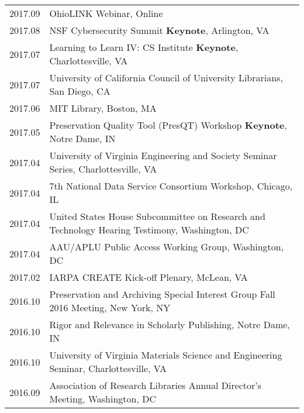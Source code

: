 \documentclass[11pt]{article}
\begin{document}
\begin{tabularx}{\textwidth}{lX}
    2017.09     & OhioLINK Webinar, Online \\ %
    2017.08     & NSF Cybersecurity Summit \textbf{Keynote}, Arlington, VA \\ %
    2017.07     & Learning to Learn IV: CS Institute \textbf{Keynote}, Charlottesville, VA \\ %
    2017.07     & University of California Council of University Librarians, San Diego, CA \\
    2017.06     & MIT Library, Boston, MA \\
    2017.05     & Preservation Quality Tool (PresQT) Workshop \textbf{Keynote}, Notre Dame, IN\\%
    2017.04     & University of Virginia Engineering and Society Seminar Series, Charlottesville, VA\\
    2017.04     & 7th National Data Service Consortium Workshop, Chicago, IL\\ %
    2017.04     & United States House Subcommittee on Research and Technology Hearing Testimony, Washington, DC\\ %
    2017.04     & AAU/APLU Public Access Working Group, Washington, DC \\
    2017.02     & IARPA CREATE Kick-off Plenary, McLean, VA\\
    2016.10     & Preservation and Archiving Special Interest Group Fall 2016 Meeting, New York, NY\\ %
    2016.10     & Rigor and Relevance in Scholarly Publishing, Notre Dame, IN\\ %
    2016.10     & University of Virginia Materials Science and Engineering Seminar, Charlottesville, VA\\ %
    2016.09     & Association of Research Libraries Annual Director's Meeting, Washington, DC\\ %

\end{tabularx}
\end{document}
